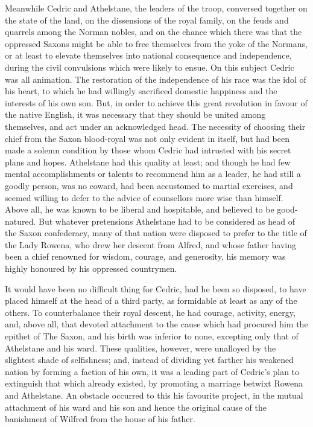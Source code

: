 Meanwhile Cedric and Athelstane, the leaders of the troop, conversed
together on the state of the land, on the dissensions of the royal
family, on the feuds and quarrels among the Norman nobles, and on the
chance which there was that the oppressed Saxons might be able to free
themselves from the yoke of the Normans, or at least to elevate
themselves into national consequence and independence, during the civil
convulsions which were likely to ensue. On this subject Cedric was all
animation. The restoration of the independence of his race was the idol
of his heart, to which he had willingly sacrificed domestic happiness
and the interests of his own son. But, in order to achieve this great
revolution in favour of the native English, it was necessary that they
should be united among themselves, and act under an acknowledged head.
The necessity of choosing their chief from the Saxon blood-royal was not
only evident in itself, but had been made a solemn condition by those
whom Cedric had intrusted with his secret plans and hopes. Athelstane
had this quality at least; and though he had few mental accomplishments
or talents to recommend him as a leader, he had still a goodly person,
was no coward, had been accustomed to martial exercises, and seemed
willing to defer to the advice of counsellors more wise than himself.
Above all, he was known to be liberal and hospitable, and believed to be
good-natured. But whatever pretensions Athelstane had to be considered
as head of the Saxon confederacy, many of that nation were disposed to
prefer to the title of the Lady Rowena, who drew her descent from
Alfred, and whose father having been a chief renowned for wisdom,
courage, and generosity, his memory was highly honoured by his oppressed
countrymen.

It would have been no difficult thing for Cedric, had he been so
disposed, to have placed himself at the head of a third party, as
formidable at least as any of the others. To counterbalance their royal
descent, he had courage, activity, energy, and, above all, that devoted
attachment to the cause which had procured him the epithet of The Saxon,
and his birth was inferior to none, excepting only that of Athelstane
and his ward. These qualities, however, were unalloyed by the slightest
shade of selfishness; and, instead of dividing yet farther his weakened
nation by forming a faction of his own, it was a leading part of
Cedric's plan to extinguish that which already existed, by promoting a
marriage betwixt Rowena and Athelstane. An obstacle occurred to this his
favourite project, in the mutual attachment of his ward and his son and
hence the original cause of the banishment of Wilfred from the house of
his father.

